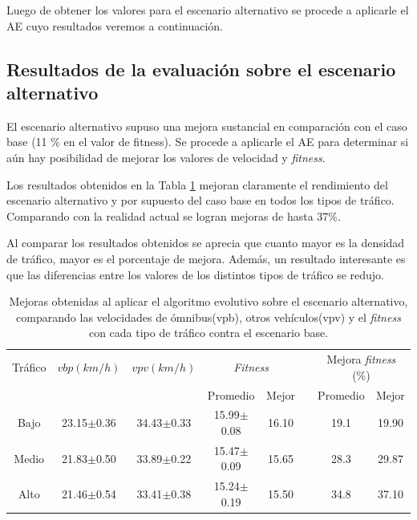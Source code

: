 Luego de obtener los valores para el escenario alternativo se procede a aplicarle el AE cuyo resultados veremos a continuación.


\subsection{Resultados de la evaluación sobre el escenario alternativo}

El escenario alternativo supuso una mejora sustancial en comparación con el caso base (11 \% en el valor de fitness). Se procede a aplicarle el AE para determinar si aún hay posibilidad de mejorar los valores de velocidad y \emph{fitness}.


Los resultados obtenidos en la Tabla \ref{table:mejoras_trafico_alternativo_algoritmo}  mejoran claramente el rendimiento del escenario alternativo y por supuesto del caso base en todos los tipos de tráfico. Comparando con la realidad actual se logran mejoras de hasta 37\%. 

Al comparar los resultados obtenidos se aprecia que cuanto mayor es la densidad de tráfico, mayor es el porcentaje de mejora. Además, un resultado interesante es que las diferencias entre los valores de los distintos tipos de tráfico se redujo.

\begin{table}[h]
	\renewcommand{\arraystretch}{1.2}
	\caption[Valores numéricos al aplicar el AE sobre el escenario alternativo.]{Mejoras obtenidas al aplicar el algoritmo evolutivo sobre el escenario alternativo, comparando las velocidades de ómnibus(vpb), otros vehículos(vpv) y el \emph{fitness} con cada tipo de tráfico contra el escenario base.}
	\label{table:mejoras_trafico_alternativo_algoritmo}
	\centering
	\begin{tabular}{cccccccc}
		\hline 
		Tráfico& 
		$vbp(km/h)$& 
		$vpv(km/h)$&
		\multicolumn{2}{c}{\emph{Fitness}}&  & 
		\multicolumn{2}{c}{Mejora \emph{fitness} (\%)}\\  \cline{4-5} \cline{7-8}&     &     & \multicolumn{1}{c}{Promedio} & \multicolumn{1}{c}{Mejor} &  & \multicolumn{1}{c}{Promedio} & \multicolumn{1}{c}{Mejor} \\ \hline

		Bajo & 23.15$\pm$0.36 & 34.43$\pm$0.33 & 15.99$\pm$0.08 & 16.10 & & 19.1& 19.90 \\
		Medio & 21.83$\pm$0.50  & 33.89$\pm$0.22 & 15.47$\pm$0.09& 15.65 & & 28.3 & 29.87\\
		Alto & 21.46$\pm$0.54  & 33.41$\pm$0.38 & 15.24$\pm$0.19& 15.50 & & 34.8 & 37.10\\	
		\hline		    
	\end{tabular}
\end{table}

